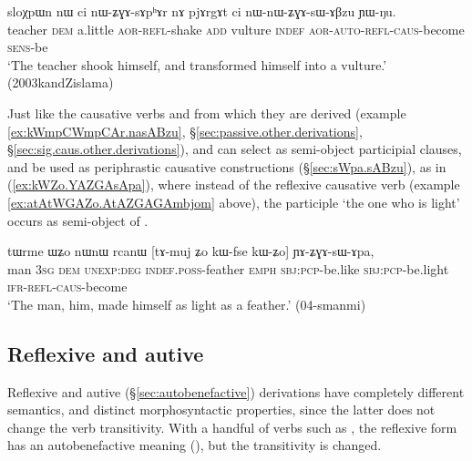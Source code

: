 \begin{exe}
\ex \label{ex:pjArgAt.nWnWZGAsABzu}
\gll sloχpɯn nɯ ci nɯ-ʑɣɤ-sɤpʰɤr nɤ pjɤrgɤt ci nɯ-nɯ-ʑɣɤ-sɯ-ɤβzu ɲɯ-ŋu. \\
teacher \textsc{dem} a.little \textsc{aor}-\textsc{refl}-shake \textsc{add} vulture \textsc{indef} \textsc{aor}-\textsc{auto}-\textsc{refl}-\textsc{caus}-become \textsc{sens}-be \\
 \glt `The teacher shook himself, and transformed himself into a vulture.'  (2003kandZislama)
\end{exe}


Just like the causative verbs   and  from which they are derived (example \ref{ex:kWmpCWmpCAr.nasABzu}, §\ref{sec:passive.other.derivations}, §\ref{sec:sig.caus.other.derivations}),  and  can select as semi-object participial clauses, and be used as periphrastic causative constructions (§\ref{sec:sWpa.sABzu}), as in (\ref{ex:kWZo.YAZGAsApa}), where instead of the reflexive causative verb  (example \ref{ex:atAtWGAZo.AtAZGAGAmbjom} above), the participle  `the one who is light' occurs as semi-object of .

 
\begin{exe}
\ex \label{ex:kWZo.YAZGAsApa}
\gll tɯrme ɯʑo nɯnɯ rcanɯ [tɤ-muj ʑo kɯ-fse kɯ-ʑo] ɲɤ-ʑɣɤ-sɯ-ɤpa, \\
man \textsc{3sg} \textsc{dem} \textsc{unexp}:\textsc{deg} \textsc{indef}.\textsc{poss}-feather \textsc{emph} \textsc{sbj}:\textsc{pcp}-be.like \textsc{sbj}:\textsc{pcp}-be.light \textsc{ifr}-\textsc{refl}-\textsc{caus}-become \\
\glt `The man, him, made himself as light as a feather.' (04-smanmi)
\end{exe}

 \subsection{Reflexive and autive} \label{sec:refl.autoben}
  
Reflexive and autive (§\ref{sec:autobenefactive}) derivations have completely different semantics, and distinct morphosyntactic properties, since the latter does not change the verb transitivity. With a handful of verbs such as , the reflexive form has an autobenefactive meaning (), but the transitivity is changed. 
 
